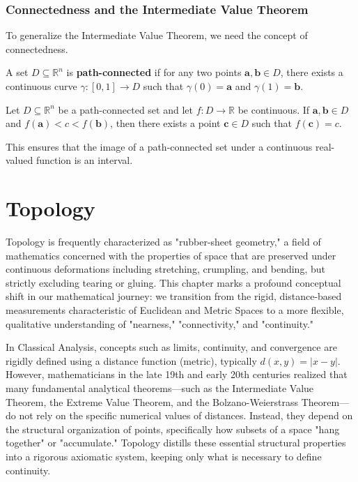 \documentclass[oneside]{book}
\begin{document}
\subsection{Connectedness and the Intermediate Value Theorem}

To generalize the Intermediate Value Theorem, we need the concept of connectedness.

\begin{definition}
A set $D \subseteq \mathbb{R}^n$ is \textbf{path-connected} if for any two points $\mathbf{a}, \mathbf{b} \in D$, there exists a continuous curve $\gamma: [0, 1] \to D$ such that $\gamma(0) = \mathbf{a}$ and $\gamma(1) = \mathbf{b}$.
\end{definition}

\begin{theorem}
Let $D \subseteq \mathbb{R}^n$ be a path-connected set and let $f: D \to \mathbb{R}$ be continuous. If $\mathbf{a}, \mathbf{b} \in D$ and $f(\mathbf{a}) < c < f(\mathbf{b})$, then there exists a point $\mathbf{c} \in D$ such that $f(\mathbf{c}) = c$.
\end{theorem}

This ensures that the image of a path-connected set under a continuous real-valued function is an interval.

\chapter{Topology}

Topology is frequently characterized as "rubber-sheet geometry," a field of mathematics concerned with the properties of space that are preserved under continuous deformations including stretching, crumpling, and bending, but strictly excluding tearing or gluing. This chapter marks a profound conceptual shift in our mathematical journey: we transition from the rigid, distance-based measurements characteristic of Euclidean and Metric Spaces to a more flexible, qualitative understanding of "nearness," "connectivity," and "continuity."

In Classical Analysis, concepts such as limits, continuity, and convergence are rigidly defined using a distance function (metric), typically $d(x, y) = |x - y|$. However, mathematicians in the late 19th and early 20th centuries realized that many fundamental analytical theorems---such as the Intermediate Value Theorem, the Extreme Value Theorem, and the Bolzano-Weierstrass Theorem---do not rely on the specific numerical values of distances. Instead, they depend on the structural organization of points, specifically how subsets of a space "hang together" or "accumulate." Topology distills these essential structural properties into a rigorous axiomatic system, keeping only what is necessary to define continuity.
\end{document}
